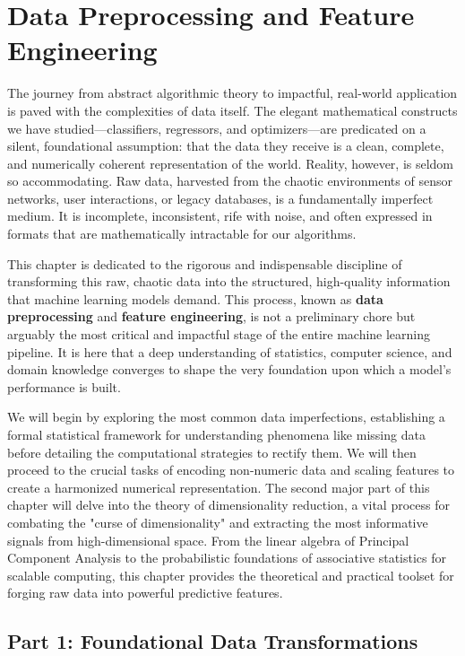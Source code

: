 \chapter{Data Preprocessing and Feature Engineering}
\label{chap:preprocessing_and_feature_engineering}

The journey from abstract algorithmic theory to impactful, real-world application is paved with the complexities of data itself. The elegant mathematical constructs we have studied—classifiers, regressors, and optimizers—are predicated on a silent, foundational assumption: that the data they receive is a clean, complete, and numerically coherent representation of the world. Reality, however, is seldom so accommodating. Raw data, harvested from the chaotic environments of sensor networks, user interactions, or legacy databases, is a fundamentally imperfect medium. It is incomplete, inconsistent, rife with noise, and often expressed in formats that are mathematically intractable for our algorithms.

This chapter is dedicated to the rigorous and indispensable discipline of transforming this raw, chaotic data into the structured, high-quality information that machine learning models demand. This process, known as \textbf{data preprocessing} and \textbf{feature engineering}, is not a preliminary chore but arguably the most critical and impactful stage of the entire machine learning pipeline. It is here that a deep understanding of statistics, computer science, and domain knowledge converges to shape the very foundation upon which a model's performance is built.

We will begin by exploring the most common data imperfections, establishing a formal statistical framework for understanding phenomena like missing data before detailing the computational strategies to rectify them. We will then proceed to the crucial tasks of encoding non-numeric data and scaling features to create a harmonized numerical representation. The second major part of this chapter will delve into the theory of dimensionality reduction, a vital process for combating the "curse of dimensionality" and extracting the most informative signals from high-dimensional space. From the linear algebra of Principal Component Analysis to the probabilistic foundations of associative statistics for scalable computing, this chapter provides the theoretical and practical toolset for forging raw data into powerful predictive features.

\section{Part 1: Foundational Data Transformations}
\label{sec:foundational_transformations}

